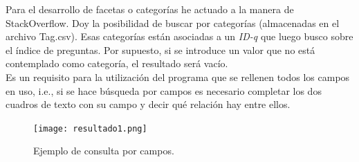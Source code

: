 Para el desarrollo de facetas o categorías he actuado a la manera de StackOverflow. Doy la posibilidad de buscar por categorías (almacenadas en el archivo Tag.csv). Esas categorías están asociadas a un \textit{ID-q} que luego busco sobre el índice de preguntas. Por supuesto, si se introduce un valor que no está contemplado como categoría, el resultado será vacío.
\\

Es un requisito para la utilización del programa que se rellenen todos los campos en uso, i.e., si se hace búsqueda por campos es necesario completar los dos cuadros de texto con su campo y decir qué relación hay entre ellos.

\begin{figure}[H] %
	\centering
	\texttt{[image: resultado1.png]}  %
	\caption{Ejemplo de consulta por campos.} 
\end{figure}

